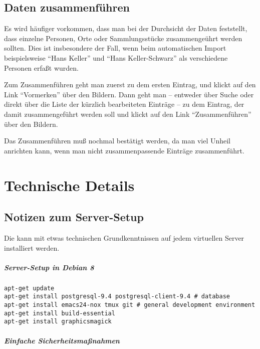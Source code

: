 \documentclass[12pt]{scrreprt}
\begin{document}
\section{Daten zusammenführen}
Es wird häufiger vorkommen, dass man bei der Durchsicht der Daten feststellt, dass
einzelne Personen, Orte oder Sammlungsstücke zusammengeührt werden sollten. Dies ist insbesondere
der Fall, wenn beim automatischen Import beispielsweise ``Hans Keller'' und ``Hans Keller-Schwarz''
als verschiedene Personen erfaßt wurden.

Zum Zusammenführen geht man zuerst zu dem ersten Eintrag, und klickt auf den Link ``Vormerken''
über den Bildern. Dann geht man -- entweder über Suche oder direkt über die Liste der kürzlich bearbeiteten
Einträge -- zu dem Eintrag, der damit zusammengeführt werden soll und klickt auf den Link
``Zusammenführen'' über den Bildern.

Das Zusammenführen muß nochmal bestätigt werden, da man viel Unheil
anrichten kann, wenn man nicht zusammenpassende Einträge
zusammenführt.




\appendix

\chapter{Technische Details}

\section{Notizen zum Server-Setup}

Die \DB{} kann mit etwas technischen Grundkenntnissen auf jedem
virtuellen Server installiert werden.


\paragraph{Server-Setup in Debian 8}

\begin{verbatim}
apt-get update
apt-get install postgresql-9.4 postgresql-client-9.4 # database
apt-get install emacs24-nox tmux git # general development environment
apt-get install build-essential
apt-get install graphicsmagick
\end{verbatim}

\paragraph{Einfache Sicherheitsmaßnahmen}
\end{document}
